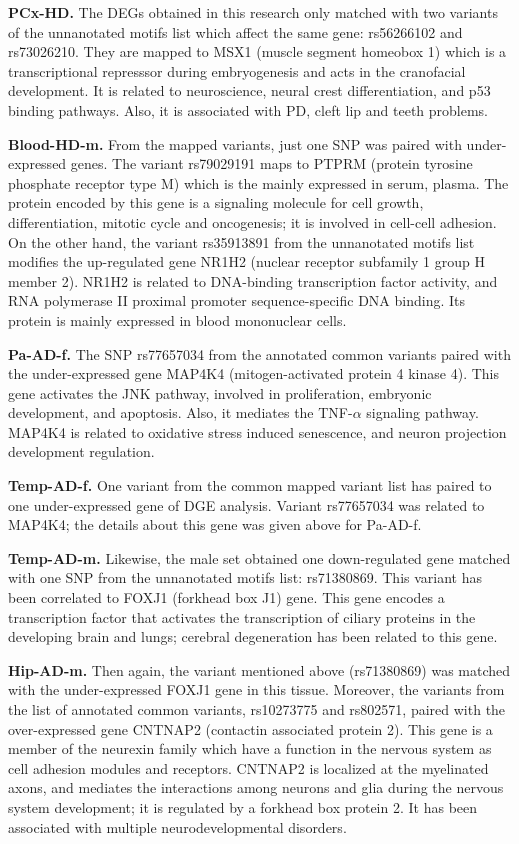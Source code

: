 \textbf{PCx-HD.} The DEGs obtained in this research only matched with two variants of the unnanotated motifs list which affect the same gene: rs56266102 and rs73026210. They are mapped to MSX1 (muscle segment homeobox 1) which is a transcriptional represssor during embryogenesis and acts in the cranofacial development. It is related to neuroscience, neural crest differentiation, and p53 binding pathways. Also, it is associated with PD, cleft lip and teeth problems.

\textbf{Blood-HD-m.} From the mapped variants, just one SNP was paired with under-expressed genes. The variant rs79029191 maps to PTPRM (protein tyrosine phosphate receptor type M) which is the mainly expressed in serum, plasma. The protein encoded by this gene is a signaling molecule for cell growth, differentiation, mitotic cycle and oncogenesis; it is involved in cell-cell adhesion. On the other hand, the variant rs35913891 from the unnanotated motifs list modifies the up-regulated gene NR1H2 (nuclear receptor subfamily 1 group H member 2). NR1H2 is related to DNA-binding transcription factor activity, and RNA polymerase II proximal promoter sequence-specific DNA binding. Its protein is mainly expressed in blood mononuclear cells.

\textbf{Pa-AD-f.} The SNP rs77657034 from the annotated common variants paired with the under-expressed gene MAP4K4 (mitogen-activated protein 4 kinase 4). This gene activates the JNK pathway, involved in proliferation, embryonic development, and apoptosis. Also, it mediates the TNF-$\alpha$ signaling pathway. MAP4K4 is related to oxidative stress induced senescence, and neuron projection development regulation.

\textbf{Temp-AD-f.} One variant from the common mapped variant list has paired to one under-expressed gene of DGE analysis. Variant rs77657034 was related to MAP4K4; the details about this gene was given above for Pa-AD-f.

\textbf{Temp-AD-m.} Likewise, the male set obtained one down-regulated gene matched with one SNP from the unnanotated motifs list: rs71380869. This variant has been correlated to FOXJ1 (forkhead box J1) gene. This gene encodes a transcription factor that activates the transcription of ciliary proteins in the developing brain and lungs; cerebral degeneration has been related to this gene.

\textbf{Hip-AD-m.} Then again, the variant mentioned above (rs71380869) was matched with the under-expressed FOXJ1 gene in this tissue. Moreover, the variants from the list of annotated common variants, rs10273775 and rs802571, paired with the over-expressed gene CNTNAP2 (contactin associated protein 2). This gene is a member of the neurexin family which have a function in the nervous system as cell adhesion modules and receptors. CNTNAP2 is localized at the myelinated axons, and mediates the interactions among neurons and glia during the nervous system development; it is regulated by a forkhead box protein 2. It has been associated with multiple neurodevelopmental disorders.


